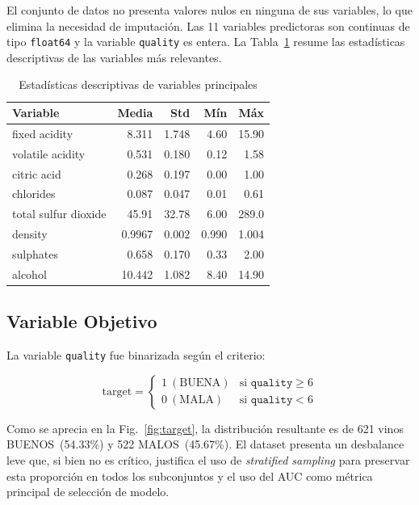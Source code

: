 \documentclass[conference]{IEEEtran}
\begin{document}
El conjunto de datos no presenta valores nulos en ninguna de sus variables, lo que elimina la necesidad de imputaci\'{o}n. Las 11 variables predictoras son continuas de tipo \texttt{float64} y la variable \texttt{quality} es entera. La Tabla~\ref{tab:estadisticas} resume las estad\'{i}sticas descriptivas de las variables m\'{a}s relevantes.

\begin{table}[H]
\caption{Estad\'{i}sticas descriptivas de variables principales}
\label{tab:estadisticas}
\centering
\begin{tabular}{lrrrr}
\toprule
\textbf{Variable} & \textbf{Media} & \textbf{Std} & \textbf{M\'{i}n} & \textbf{M\'{a}x} \\
\midrule
fixed acidity        & 8.311  & 1.748 & 4.60  & 15.90 \\
volatile acidity     & 0.531  & 0.180 & 0.12  & 1.58  \\
citric acid          & 0.268  & 0.197 & 0.00  & 1.00  \\
chlorides            & 0.087  & 0.047 & 0.01  & 0.61  \\
total sulfur dioxide & 45.91  & 32.78 & 6.00  & 289.0 \\
density              & 0.9967 & 0.002 & 0.990 & 1.004 \\
sulphates            & 0.658  & 0.170 & 0.33  & 2.00  \\
alcohol              & 10.442 & 1.082 & 8.40  & 14.90 \\
\bottomrule
\end{tabular}
\end{table}

\subsection{Variable Objetivo}

La variable \texttt{quality} fue binarizada seg\'{u}n el criterio:

\begin{equation}
  \text{target} =
  \begin{cases}
    1\ (\text{BUENA}) & \text{si } \texttt{quality} \geq 6 \\
    0\ (\text{MALA})  & \text{si } \texttt{quality} < 6
  \end{cases}
\end{equation}

Como se aprecia en la Fig.~\ref{fig:target}, la distribuci\'{o}n resultante es de 621 vinos BUENOS~(54.33\%) y 522 MALOS~(45.67\%). El dataset presenta un desbalance leve que, si bien no es cr\'{i}tico, justifica el uso de \textit{stratified sampling} para preservar esta proporci\'{o}n en todos los subconjuntos y el uso del AUC como m\'{e}trica principal de selecci\'{o}n de modelo.
\end{document}
